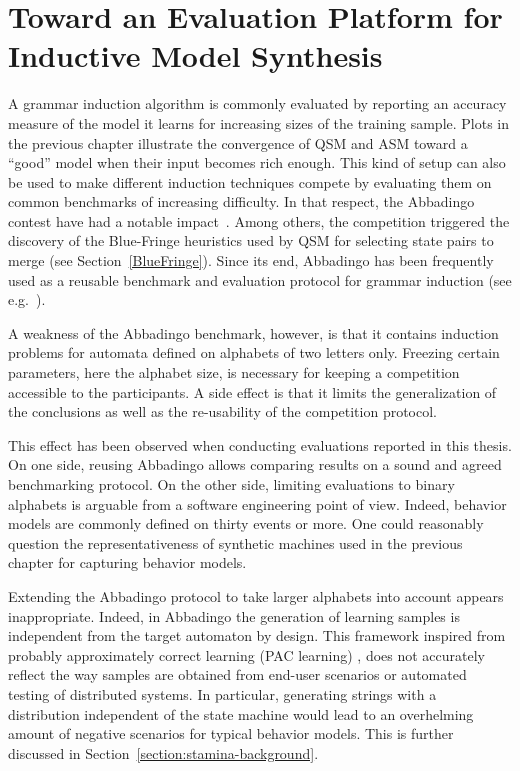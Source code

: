 \chapter{Toward an Evaluation Platform for Inductive Model Synthesis\label{chapter:stamina}}

A grammar induction algorithm is commonly evaluated by reporting an accuracy measure of the model it learns for increasing sizes of the training sample. Plots in the previous chapter illustrate the convergence of QSM and ASM toward a ``good'' model when their input becomes rich enough. This kind of setup can also be used to make different induction techniques compete by evaluating them on common benchmarks of increasing difficulty. In that respect, the Abbadingo contest have had a notable impact~\cite{Lang:1998}. Among others, the competition triggered the discovery of the Blue-Fringe heuristics used by QSM for selecting state pairs to merge (see Section~\ref{BlueFringe}). Since its end, Abbadingo has been frequently used as a reusable benchmark and evaluation protocol for grammar induction (see e.g.~\cite{Lucas:2003, Bongard:2005, Lucas:2005, Adriaans:2006, Dupont:2008, Lambeau:2008, Heule:2010}).

A weakness of the Abbadingo benchmark, however, is that it contains induction problems for automata defined on alphabets of two letters only. Freezing certain parameters, here the alphabet size, is necessary for keeping a competition accessible to the participants. A side effect is that it limits the generalization of the conclusions as well as the re-usability of the competition protocol. 

This effect has been observed when conducting evaluations reported in this thesis. On one side, reusing Abbadingo allows comparing results on a sound and agreed benchmarking protocol. On the other side, limiting evaluations to binary alphabets is arguable from a software engineering point of view. Indeed, behavior models are commonly defined on thirty events or more. One could reasonably question the representativeness of synthetic machines used in the previous chapter for capturing behavior models.

Extending the Abbadingo protocol to take larger alphabets into account appears inappropriate. Indeed, in Abbadingo the generation of learning samples is independent from the target automaton by design. This framework inspired from probably approximately correct learning (PAC learning) \cite{Valiant:1984}, does not accurately reflect the way samples are obtained from end-user scenarios or automated testing of distributed systems. In particular, generating strings with a distribution independent of the state machine would lead to an overhelming amount of negative scenarios for typical behavior models. This is further discussed in Section~\ref{section:stamina-background}.

